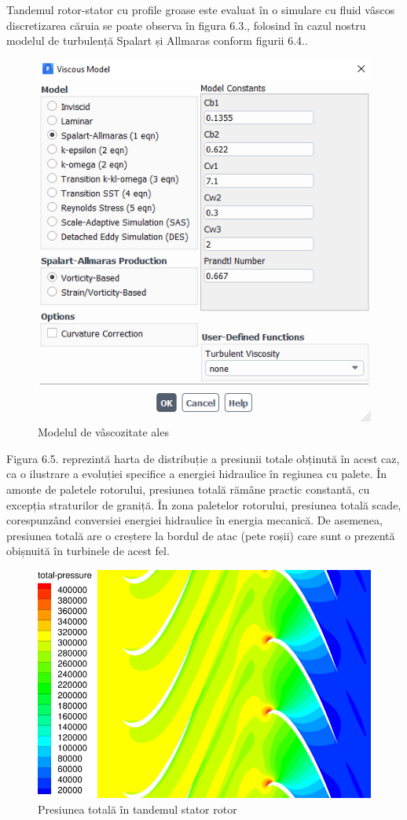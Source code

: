 Tandemul rotor-stator cu profile groase este evaluat în o simulare cu fluid vâscos discretizarea căruia se poate observa în figura 6.3., folosind în cazul nostru modelul de turbulență Spalart și Allmaras \cite{spalart1992one} conform figurii 6.4..

\begin{figure}
	\centering
	\includegraphics[scale=0.7]{figures/tandem_thick_viscous_model.PNG}
	\caption{Modelul de vâscozitate ales}
	\label{Modelul de vâscozitate ales}
\end{figure}

Figura 6.5. reprezintă harta de distribuție a presiunii totale obținută în acest caz, ca o ilustrare a evoluției specifice a energiei hidraulice în regiunea cu palete. În amonte de paletele rotorului, presiunea totală rămâne practic constantă, cu excepția straturilor de graniță. În zona paletelor rotorului, presiunea totală scade, corespunzând conversiei energiei hidraulice în energia mecanică. De asemenea, presiunea totală are o creștere la bordul de atac (pete roșii) care sunt o prezentă obișnuită în turbinele de acest fel.

\begin{figure}
	\centering
	\includegraphics[scale=1]{figures/presiunea-totala.png}
	\caption{Presiunea totală în tandemul stator rotor}
	\label{Presiunea totală în tandemul stator rotor}
\end{figure}